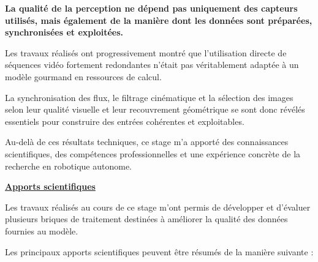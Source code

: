 \documentclass[12pt,a4paper,oneside]{report}
\begin{document}
\hspace*{0.5cm}\textbf{La qualité de la perception ne dépend pas uniquement des capteurs utilisés, mais également de la manière dont les données sont préparées, synchronisées et exploitées.}\vspace{0.1cm}

\hspace*{1cm}Les travaux réalisés ont progressivement montré que l'utilisation directe de séquences vidéo fortement redondantes n'était pas véritablement adaptée à un modèle gourmand en ressources de calcul.\vspace{0.01cm}

\hspace*{0.5cm}La synchronisation des flux, le filtrage cinématique et la sélection des images selon leur qualité visuelle et leur recouvrement géométrique se sont donc révélés essentiels pour construire des entrées cohérentes et exploitables.\vspace{0.1cm}

\hspace*{1cm}Au-delà de ces résultats techniques, ce stage m'a apporté des connaissances scientifiques, des compétences professionnelles et une expérience concrète de la recherche en robotique autonome.

\vspace{0.5cm}

\noindent\textbf{\uline{\large {Apports scientifiques}}}\par
\medskip

\vspace{0.5cm}

\hspace*{1cm}Les travaux réalisés au cours de ce stage m'ont permis de développer et d'évaluer plusieurs briques de traitement destinées à améliorer la qualité des données fournies au modèle. \vspace{0.1cm}

\hspace*{0.5cm}Les principaux apports scientifiques peuvent être résumés de la manière suivante :
\end{document}
